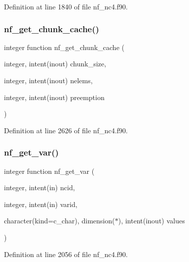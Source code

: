 Definition at line 1840 of file nf\+\_\+nc4.\+f90.

\mbox{\label{nf__nc4_8f90_ac4731c257db212aaaef52131eea90403}} 
\subsubsection{\texorpdfstring{nf\+\_\+get\+\_\+chunk\+\_\+cache()}{nf\_get\_chunk\_cache()}}
{\footnotesize\ttfamily integer function nf\+\_\+get\+\_\+chunk\+\_\+cache (\begin{DoxyParamCaption}\item[{integer, intent(inout)}]{chunk\+\_\+size,  }\item[{integer, intent(inout)}]{nelems,  }\item[{integer, intent(inout)}]{preemption }\end{DoxyParamCaption})}



Definition at line 2626 of file nf\+\_\+nc4.\+f90.

\mbox{\label{nf__nc4_8f90_aa4198aa931954a0d561f7e446e221213}} 
\subsubsection{\texorpdfstring{nf\+\_\+get\+\_\+var()}{nf\_get\_var()}}
{\footnotesize\ttfamily integer function nf\+\_\+get\+\_\+var (\begin{DoxyParamCaption}\item[{integer, intent(in)}]{ncid,  }\item[{integer, intent(in)}]{varid,  }\item[{character(kind=c\+\_\+char), dimension($\ast$), intent(inout)}]{values }\end{DoxyParamCaption})}



Definition at line 2056 of file nf\+\_\+nc4.\+f90.

\mbox{\label{nf__nc4_8f90_a208479237be0144193d0b1cd32062b8d}} 
